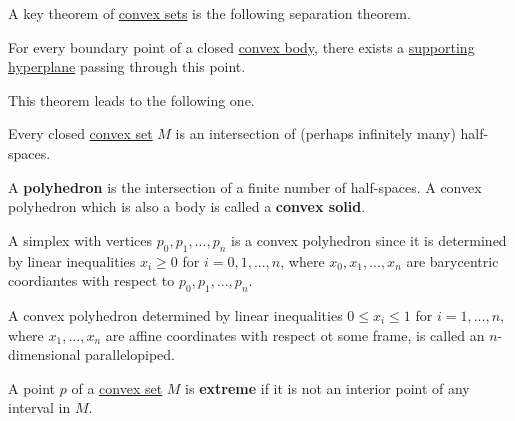  A key theorem of \hyperref[st-def:convex-sets]{convex sets} is the following separation theorem. 

  \begin{theorem}
    \label{thm:separation-theorem}
    For every boundary point of a closed \hyperref[def:convex-body]{convex body}, there exists a \hyperref[def:supporting-hyperplane]{supporting hyperplane} passing through this point. 
  \end{theorem}

  This theorem leads to the following one. 

  \begin{theorem}
    \label{thm:closed-convex-sets-as-intersections-of-half}
    Every closed \hyperref[def:convex-set]{convex set} $M$ is an intersection of (perhaps infinitely many) half-spaces. 
  \end{theorem}

  \begin{definition}[Polyhedron]
    \label{def:polyhedron}
    A \textbf{polyhedron} is the intersection of a finite number of half-spaces. A convex polyhedron which is also a body is called a \textbf{convex solid}. 
  \end{definition}

  \begin{example}
    \label{ex:the-simplex-as-a-convex-polyhedron}
    A simplex with vertices $p_0, p_1, ..., p_n$ is a convex polyhedron since it is determined by linear inequalities $x_i \geq 0$ for $i = 0, 1, ..., n$, where $x_0, x_1, ..., x_n$ are barycentric coordiantes with respect to $p_0, p_1,..., p_n$. 
  \end{example}

  \begin{example}
    \label{ex:the-cube-as-a-convex-polyhedron}
    A convex polyhedron determined by linear inequalities $0 \leq x_i \leq 1$ for $i = 1, ..., n$, where $x_1,..., x_n$ are affine coordinates with respect ot some frame, is called an $n$-dimensional parallelopiped. 
  \end{example}

  \begin{definition}
    \label{def:extreme-point}
    A point $p$ of a \hyperref[def:convex-set]{convex set} $M$ is \textbf{extreme} if it is not an interior point of any interval in $M$. 
  \end{definition}

